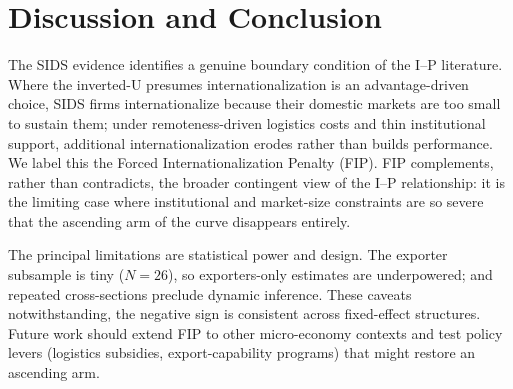 \documentclass[12pt,a4paper]{article}
\begin{document}
\section{Discussion and Conclusion}
The SIDS evidence identifies a genuine boundary condition of the I--P
literature. Where the inverted-U presumes internationalization is an
advantage-driven choice, SIDS firms internationalize because their domestic
markets are too small to sustain them; under remoteness-driven logistics costs
and thin institutional support, additional internationalization erodes rather
than builds performance. We label this the Forced Internationalization Penalty
(FIP). FIP complements, rather than contradicts, the broader contingent view
of the I--P relationship: it is the limiting case where institutional and
market-size constraints are so severe that the ascending arm of the curve
disappears entirely.

The principal limitations are statistical power and design. The exporter
subsample is tiny ($N = 26$), so exporters-only estimates are
underpowered; and repeated cross-sections preclude dynamic inference. These
caveats notwithstanding, the negative sign is consistent across fixed-effect
structures. Future work should extend FIP to other micro-economy contexts and
test policy levers (logistics subsidies, export-capability programs) that
might restore an ascending arm.


\end{document}
